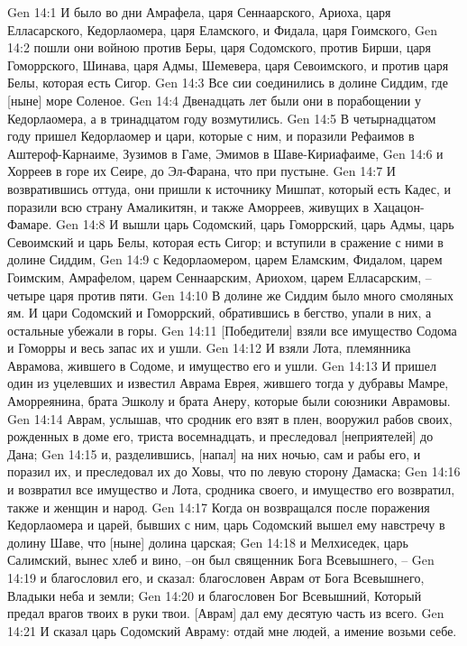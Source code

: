Gen 14:1  И было во дни Амрафела, царя Сеннаарского, Ариоха, царя Елласарского, Кедорлаомера, царя Еламского, и Фидала, царя Гоимского,
Gen 14:2  пошли они войною против Беры, царя Содомского, против Бирши, царя Гоморрского, Шинава, царя Адмы, Шемевера, царя Севоимского, и против царя Белы, которая есть Сигор.
Gen 14:3  Все сии соединились в долине Сиддим, где [ныне] море Соленое.
Gen 14:4  Двенадцать лет были они в порабощении у Кедорлаомера, а в тринадцатом году возмутились.
Gen 14:5  В четырнадцатом году пришел Кедорлаомер и цари, которые с ним, и поразили Рефаимов в Аштероф-Карнаиме, Зузимов в Гаме, Эмимов в Шаве-Кириафаиме,
Gen 14:6  и Хорреев в горе их Сеире, до Эл-Фарана, что при пустыне.
Gen 14:7  И возвратившись оттуда, они пришли к источнику Мишпат, который есть Кадес, и поразили всю страну Амаликитян, и также Аморреев, живущих в Хацацон-Фамаре.
Gen 14:8  И вышли царь Содомский, царь Гоморрский, царь Адмы, царь Севоимский и царь Белы, которая есть Сигор; и вступили в сражение с ними в долине Сиддим,
Gen 14:9  с Кедорлаомером, царем Еламским, Фидалом, царем Гоимским, Амрафелом, царем Сеннаарским, Ариохом, царем Елласарским, --четыре царя против пяти.
Gen 14:10  В долине же Сиддим было много смоляных ям. И цари Содомский и Гоморрский, обратившись в бегство, упали в них, а остальные убежали в горы.
Gen 14:11  [Победители] взяли все имущество Содома и Гоморры и весь запас их и ушли.
Gen 14:12  И взяли Лота, племянника Аврамова, жившего в Содоме, и имущество его и ушли.
Gen 14:13  И пришел один из уцелевших и известил Аврама Еврея, жившего тогда у дубравы Мамре, Аморреянина, брата Эшколу и брата Анеру, которые были союзники Аврамовы.
Gen 14:14  Аврам, услышав, что сродник его взят в плен, вооружил рабов своих, рожденных в доме его, триста восемнадцать, и преследовал [неприятелей] до Дана;
Gen 14:15  и, разделившись, [напал] на них ночью, сам и рабы его, и поразил их, и преследовал их до Ховы, что по левую сторону Дамаска;
Gen 14:16  и возвратил все имущество и Лота, сродника своего, и имущество его возвратил, также и женщин и народ.
Gen 14:17  Когда он возвращался после поражения Кедорлаомера и царей, бывших с ним, царь Содомский вышел ему навстречу в долину Шаве, что [ныне] долина царская;
Gen 14:18  и Мелхиседек, царь Салимский, вынес хлеб и вино, --он был священник Бога Всевышнего, --
Gen 14:19  и благословил его, и сказал: благословен Аврам от Бога Всевышнего, Владыки неба и земли;
Gen 14:20  и благословен Бог Всевышний, Который предал врагов твоих в руки твои. [Аврам] дал ему десятую часть из всего.
Gen 14:21  И сказал царь Содомский Авраму: отдай мне людей, а имение возьми себе.
